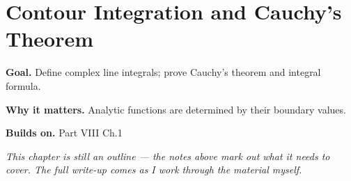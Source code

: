 \chapter{Contour Integration and Cauchy's Theorem}
\label{ch:08-complex-analysis-and-harmonic-analysis-02}

\begin{chapterintro}
\textbf{Goal.} Define complex line integrals; prove Cauchy's theorem and integral formula.

\textbf{Why it matters.} Analytic functions are determined by their boundary values.

\textbf{Builds on.} Part VIII Ch.1
\end{chapterintro}

\textit{This chapter is still an outline --- the notes above mark out what it needs to cover. The full write-up comes as I work through the material myself.}
